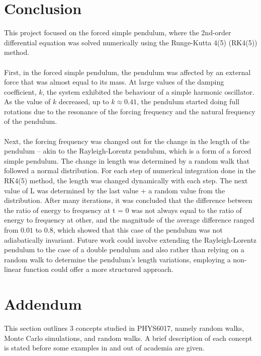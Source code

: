 \documentclass[10pt, twocolumn]{article}
\begin{document}
\section{Conclusion}
This project focused on the forced simple pendulum, where the 2nd-order differential equation was solved numerically using the Runge-Kutta 4(5) (RK4(5)) method.\\
\\
First, in the forced simple pendulum, the pendulum was affected by an external force that was almost equal to its mass. At large values of the damping coefficient, $k$, the system exhibited the behaviour of a simple harmonic oscillator. As the value of $k$ decreased, up to $k\approx 0.41$, the pendulum started doing full rotations due to the resonance of the forcing frequency and the natural frequency of the pendulum.\\
\\
Next, the forcing frequency was changed out for the change in the length of the pendulum -- akin to the Rayleigh-Lorentz pendulum, which is a form of a forced simple pendulum. The change in length was determined by a random walk that followed a normal distribution. For each step of numerical integration done in the RK4(5) method, the length was changed dynamically with each step. The next value of L was determined by the last value + a random value from the distribution. After many iterations, it was concluded that the difference between the ratio of energy to frequency at t = 0 was not always equal to the ratio of energy to frequency at other, and the magnitude of the average difference ranged from $0.01$ to $0.8$, which showed that this case of the pendulum was not adiabatically invariant. Future work could involve extending the Rayleigh-Lorentz pendulum to the case of a double pendulum and also rather than relying on a random walk to determine the pendulum's length variations, employing a non-linear function could offer a more structured approach. 
\onecolumn
\newpage
\twocolumn
\section{Addendum} %
This section outlines 3 concepts studied in PHYS6017, namely random walks, Monte Carlo simulations, and random walks. A brief description of each concept is stated before some examples in and out of academia are given.
\end{document}
